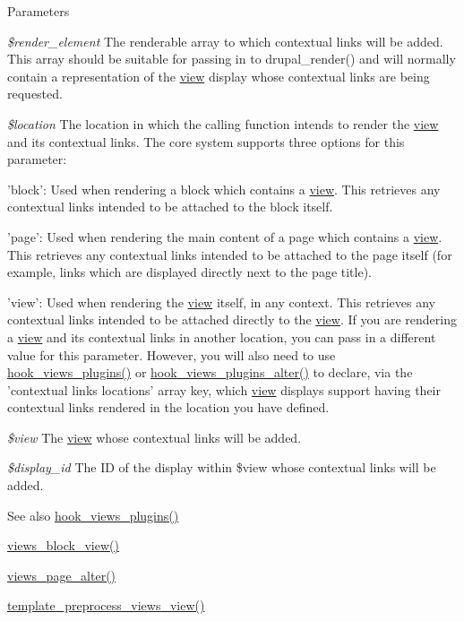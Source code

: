 \begin{DoxyParams}{Parameters}
\item[{\em \$render\_\-element}]The renderable array to which contextual links will be added. This array should be suitable for passing in to drupal\_\-render() and will normally contain a representation of the \hyperlink{classview}{view} display whose contextual links are being requested. \item[{\em \$location}]The location in which the calling function intends to render the \hyperlink{classview}{view} and its contextual links. The core system supports three options for this parameter:
\begin{DoxyItemize}
\item 'block': Used when rendering a block which contains a \hyperlink{classview}{view}. This retrieves any contextual links intended to be attached to the block itself.
\item 'page': Used when rendering the main content of a page which contains a \hyperlink{classview}{view}. This retrieves any contextual links intended to be attached to the page itself (for example, links which are displayed directly next to the page title).
\item 'view': Used when rendering the \hyperlink{classview}{view} itself, in any context. This retrieves any contextual links intended to be attached directly to the \hyperlink{classview}{view}. If you are rendering a \hyperlink{classview}{view} and its contextual links in another location, you can pass in a different value for this parameter. However, you will also need to use \hyperlink{group__views__hooks_ga23f6e9972b2ed84fc54b7ff63f44477d}{hook\_\-views\_\-plugins()} or \hyperlink{group__views__hooks_ga6c4e4c2a769b0017bf0edcd0adae57e9}{hook\_\-views\_\-plugins\_\-alter()} to declare, via the 'contextual links locations' array key, which \hyperlink{classview}{view} displays support having their contextual links rendered in the location you have defined. 
\end{DoxyItemize}\item[{\em \$view}]The \hyperlink{classview}{view} whose contextual links will be added. \item[{\em \$display\_\-id}]The ID of the display within \$view whose contextual links will be added.\end{DoxyParams}
\begin{DoxySeeAlso}{See also}
\hyperlink{group__views__hooks_ga23f6e9972b2ed84fc54b7ff63f44477d}{hook\_\-views\_\-plugins()} 

\hyperlink{views_8module_ae2b10c93b6c54fb61100759aed3b7299}{views\_\-block\_\-view()} 

\hyperlink{views_8module_a278afcd00ca124837da7016ede4e64b2}{views\_\-page\_\-alter()} 

\hyperlink{views_2theme_2theme_8inc_a9390b0a0ab9315839031fadfc73df433}{template\_\-preprocess\_\-views\_\-view()} 
\end{DoxySeeAlso}
